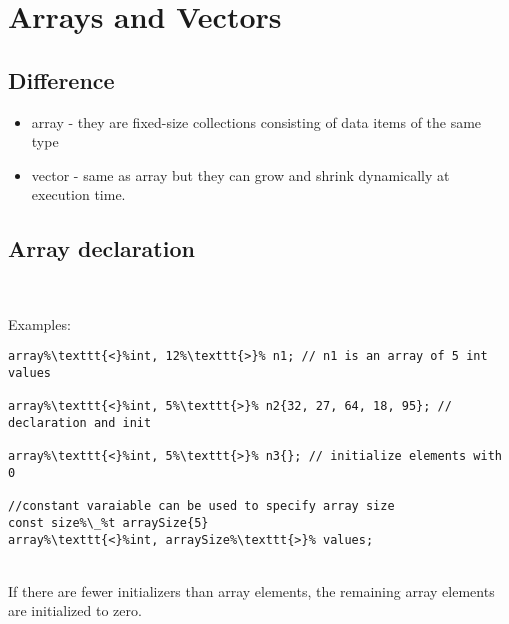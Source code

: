 \section{Arrays and Vectors}
\label{sec:Arrays-and-Vectors}
\subsection{Difference}
\begin{itemize}
    \item array - they are fixed-size collections consisting of data items of the same type
    \item vector - same as array but they can grow and shrink dynamically at execution time. 
\end{itemize}

\subsection{Array declaration}
\begin{minipage}{.5\textwidth}
\end{minipage}\hspace{0.72cm}
\begin{minipage}{.3\textwidth}
\vspace{0.1cm}
\begin{lstlisting}[frame=tlrb,numbers=none,mathescape=true,escapechar=\%,columns=flexible]
%\texttt{array<type, arraySize> arrayName;}%
\end{lstlisting}
\end{minipage}
\\
Examples:\\
\begin{minipage}{.5\textwidth}
\end{minipage}\hspace{0.72cm}
\begin{minipage}{.6\textwidth}
\vspace{0.1cm}
\begin{lstlisting}[frame=tlrb,numbers=none,mathescape=true,escapechar=\%,columns=flexible]
array%\texttt{<}%int, 12%\texttt{>}% n1; // n1 is an array of 5 int values

array%\texttt{<}%int, 5%\texttt{>}% n2{32, 27, 64, 18, 95}; // declaration and init

array%\texttt{<}%int, 5%\texttt{>}% n3{}; // initialize elements with 0 

//constant varaiable can be used to specify array size
const size%\_%t arraySize{5} 
array%\texttt{<}%int, arraySize%\texttt{>}% values; 
\end{lstlisting}
\end{minipage}
\\
If there are fewer initializers than array elements, the remaining array elements are initialized
to zero.\\

